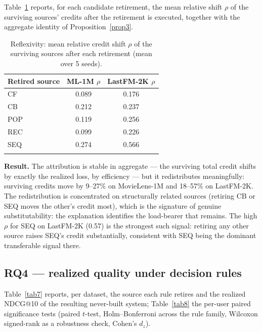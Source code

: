 \documentclass[pdflatex,sn-mathphys-num]{sn-jnl}
\theoremstyle{thmstyleone}%
\theoremstyle{thmstyletwo}%
\theoremstyle{thmstylethree}%
\begin{document}
Table~\ref{tab6} reports, for each candidate retirement, the mean relative shift $\rho$ of the surviving sources' credits after the retirement is executed, together with the aggregate identity of Proposition~\ref{prop3}.

\begin{table}[h]
\caption{Reflexivity: mean relative credit shift $\rho$ of the surviving sources after each retirement (mean over 5 seeds).}
\label{tab6}
\begin{tabular*}{\textwidth}{@{\extracolsep\fill}lcc}
\toprule
Retired source & ML-1M $\rho$ & LastFM-2K $\rho$ \\
\midrule
CF & 0.089 & 0.176 \\
CB & 0.212 & 0.237 \\
POP & 0.119 & 0.256 \\
REC & 0.099 & 0.226 \\
SEQ & 0.274 & 0.566 \\
\botrule
\end{tabular*}
\end{table}

\textbf{Result.} The attribution is stable in aggregate --- the surviving total credit shifts by exactly the realized loss, by efficiency --- but it redistributes meaningfully: surviving credits move by 9--27\% on MovieLens-1M and 18--57\% on LastFM-2K. The redistribution is concentrated on structurally related sources (retiring CB or SEQ moves the other's credit most), which is the signature of genuine substitutability: the explanation identifies the load-bearer that remains. The high $\rho$ for SEQ on LastFM-2K (0.57) is the strongest such signal: retiring any other source raises SEQ's credit substantially, consistent with SEQ being the dominant transferable signal there.

\subsection{RQ4 --- realized quality under decision rules}\label{subsec4_6}

Table~\ref{tab7} reports, per dataset, the source each rule retires and the realized NDCG@10 of the resulting never-built system; Table~\ref{tab8} the per-user paired significance tests (paired $t$-test, Holm--Bonferroni across the rule family, Wilcoxon signed-rank as a robustness check, Cohen's $d_z$).
\end{document}
